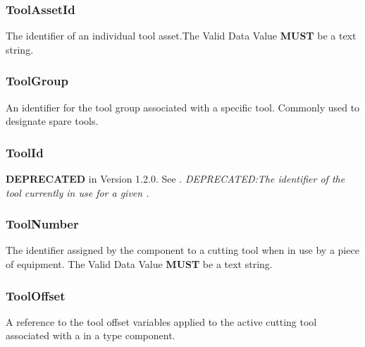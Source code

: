 \subsubsection{ToolAssetId}
\label{sec:ToolAssetId}



The identifier of an individual tool asset.The \gls{Valid Data Value} \textbf{MUST} be a text string.

\FloatBarrier

\subsubsection{ToolGroup}
\label{sec:ToolGroup}



An identifier for the tool group associated with a specific tool. Commonly used to designate spare tools.

\FloatBarrier

\subsubsection{ToolId}
\label{sec:ToolId}



\textbf{DEPRECATED} in Version 1.2.0.   See . \textit{DEPRECATED:The identifier of the tool currently in use for a given .}

\FloatBarrier

\subsubsection{ToolNumber}
\label{sec:ToolNumber}



The identifier assigned by the  component to a cutting tool when in use by a piece of equipment. 
 The \gls{Valid Data Value} \textbf{MUST} be a text string.

\FloatBarrier

\subsubsection{ToolOffset}
\label{sec:ToolOffset}



A reference to the tool offset variables applied to the active cutting tool associated with a  in a  type component.


